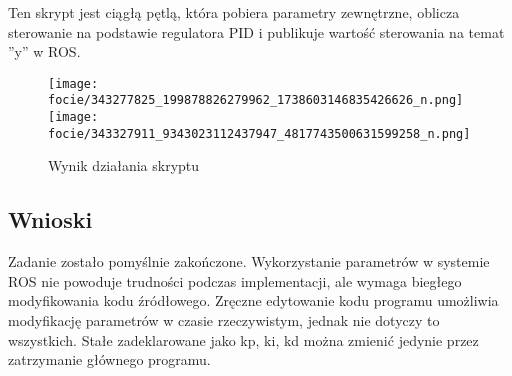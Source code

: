 \documentclass[10pt,a4paper,twoside,twocolumn]{article}%
\begin{document}
Ten skrypt jest ciągłą pętlą, która pobiera parametry zewnętrzne, oblicza sterowanie na podstawie regulatora PID i publikuje wartość sterowania na temat ''y'' w ROS.


\begin{figure}[H]
    \centering
    \texttt{[image: focie/343277825\_199878826279962\_1738603146835426626\_n.png]}
    \texttt{[image: focie/343327911\_9343023112437947\_4817743500631599258\_n.png]}
    \caption{Wynik działania skryptu}
    \label{fig:2}
\end{figure}

\subsection{Wnioski}
Zadanie zostało pomyślnie zakończone. Wykorzystanie parametrów w systemie ROS nie powoduje trudności podczas implementacji, ale wymaga biegłego modyfikowania kodu źródłowego. Zręczne edytowanie kodu programu umożliwia modyfikację parametrów w czasie rzeczywistym, jednak nie dotyczy to wszystkich. Stałe zadeklarowane jako kp, ki, kd można zmienić jedynie przez zatrzymanie głównego programu.
\end{document}
